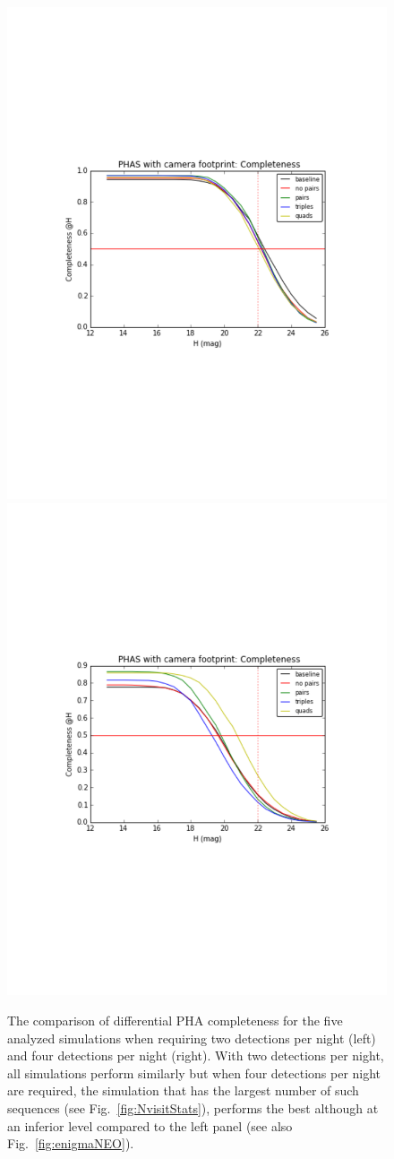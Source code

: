\documentclass[manuscript]{article}
\begin{document}
\begin{figure}[th!]
\vskip -1.2in
\includegraphics[angle=0,width=0.49\hsize,clip]{diffNEOpairs.pdf}
\includegraphics[angle=0,width=0.49\hsize,clip]{diffNEOquads.pdf}
\vskip -1.3in
\caption{
The comparison of differential PHA completeness for the five analyzed simulations
when requiring two detections per night (left) and four detections per night (right). 
With two detections per night, all simulations perform similarly but when four 
detections per night are required, the simulation that has the largest number
of such sequences (see Fig.~\ref{fig:NvisitStats}), performs the best although at an
inferior level compared to the left panel (see also Fig.~\ref{fig:enigmaNEO}).} 
\label{fig:NEOquads}
\end{figure}
\end{document}
